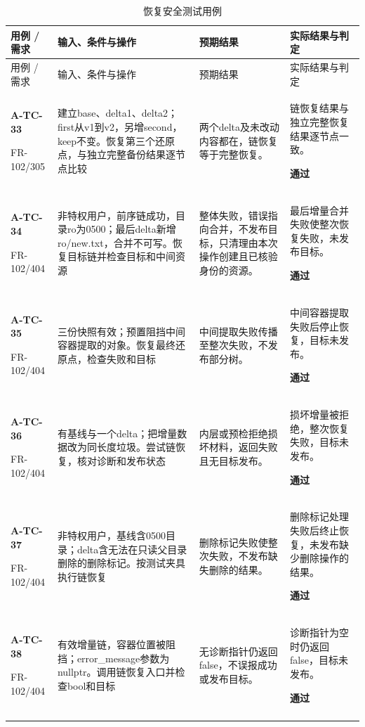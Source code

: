 \begin{longtable}{@{}L{.14\linewidth}L{.36\linewidth}L{.21\linewidth}L{.23\linewidth}@{}}
\caption{恢复安全测试用例}\label{tab:test-6}\\
\toprule 用例 / 需求 & 输入、条件与操作 & 预期结果 & 实际结果与判定\\\midrule\endfirsthead
\toprule 用例 / 需求 & 输入、条件与操作 & 预期结果 & 实际结果与判定\\\midrule\endhead
\bottomrule\endfoot
\textbf{A-TC-33}\par{\footnotesize FR-102/305} & 建立base、delta1、delta2；first从v1到v2，另增second，keep不变。恢复第三个还原点，与独立完整备份结果逐节点比较 & 两个delta及未改动内容都在，链恢复等于完整恢复。 & 链恢复结果与独立完整恢复结果逐节点一致。\par\textbf{通过}\\\addlinespace[2pt]
\textbf{A-TC-34}\par{\footnotesize FR-102/404} & 非特权用户，前序链成功，目录ro为0500；最后delta新增ro/new.txt，合并不可写。恢复目标链并检查目标和中间资源 & 整体失败，错误指向合并，不发布目标，只清理由本次操作创建且已核验身份的资源。 & 最后增量合并失败使整次恢复失败，未发布目标。\par\textbf{通过}\\\addlinespace[2pt]
\textbf{A-TC-35}\par{\footnotesize FR-102/404} & 三份快照有效；预置阻挡中间容器提取的对象。恢复最终还原点，检查失败和目标 & 中间提取失败传播至整次失败，不发布部分树。 & 中间容器提取失败后停止恢复，目标未发布。\par\textbf{通过}\\\addlinespace[2pt]
\textbf{A-TC-36}\par{\footnotesize FR-102/404} & 有基线与一个delta；把增量数据改为同长度垃圾。尝试链恢复，核对诊断和发布状态 & 内层或预检拒绝损坏材料，返回失败且无目标发布。 & 损坏增量被拒绝，整次恢复失败，目标未发布。\par\textbf{通过}\\\addlinespace[2pt]
\textbf{A-TC-37}\par{\footnotesize FR-102/404} & 非特权用户，基线含0500目录；delta含无法在只读父目录删除的删除标记。按测试夹具执行链恢复 & 删除标记失败使整次失败，不发布缺失删除的结果。 & 删除标记处理失败后终止恢复，未发布缺少删除操作的结果。\par\textbf{通过}\\\addlinespace[2pt]
\textbf{A-TC-38}\par{\footnotesize FR-102/404} & 有效增量链，容器位置被阻挡；error\_message参数为nullptr。调用链恢复入口并检查bool和目标 & 无诊断指针仍返回false，不误报成功或发布目标。 & 诊断指针为空时仍返回false，目标未发布。\par\textbf{通过}\\\addlinespace[2pt]

\end{longtable}
